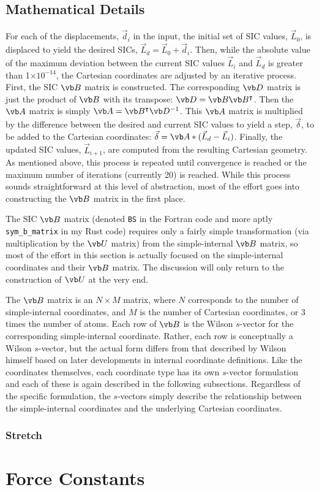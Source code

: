 \documentclass{article}
\newcommand\e[1]{$\times 10^{#1}$}
\begin{document}
\subsection{Mathematical Details}
\label{sec:disp-math}

For each of the displacements, $\vec{d}_i$ in the input, the initial set of SIC
values, $\vec{L}_0$, is displaced to yield the desired SICs,
$\vec{L}_d = \vec{L}_0 + \vec{d}_i$. Then, while the absolute value of the
maximum deviation between the current SIC values $\vec{L}_i$ and $\vec{L}_d$ is
greater than 1\e{-14}, the Cartesian coordinates are adjusted by an iterative
process. First, the SIC $\vb B$ matrix is constructed. The corresponding $\vb D$
matrix is just the product of $\vb B$ with its transpose:
$\vb D = \vb B \vb B^\intercal$. Then the $\vb A$ matrix is simply
$\vb A = \vb B^\intercal \vb D^{-1}$. This $\vb A$ matrix is multiplied by the
difference between the desired and current SIC values to yield a step,
$\vec{\delta}$, to be added to the Cartesian coordinates:
$\vec{\delta} = \vb A * (\vec{L}_d - \vec{L}_i)$. Finally, the updated SIC
values, $\vec{L}_{i+1}$, are computed from the resulting Cartesian geometry. As
mentioned above, this process is repeated until convergence is reached or the
maximum number of iterations (currently 20) is reached. While this process
sounds straightforward at this level of abstraction, most of the effort goes
into constructing the $\vb B$ matrix in the first place.

The SIC $\vb B$ matrix (denoted \verb|BS| in the Fortran code and more aptly
\verb|sym_b_matrix| in my Rust code) requires only a fairly simple
transformation (via multiplication by the $\vb U$ matrix) from the
simple-internal $\vb B$ matrix, so most of the effort in this section is
actually focused on the simple-internal coordinates and their $\vb B$ matrix.
The discussion will only return to the construction of $\vb U$ at the very end.

The $\vb B$ matrix is an $N \times M$ matrix, where $N$ corresponds to the
number of simple-internal coordinates, and $M$ is the number of Cartesian
coordinates, or 3 times the number of atoms. Each row of $\vb B$ is the Wilson
$s$-vector for the corresponding simple-internal coordinate. Rather, each row is
conceptually a Wilson $s$-vector, but the actual form differs from that
described by Wilson himself based on later developments in internal coordinate
definitions. Like the coordinates themselves, each coordinate type has its own
$s$-vector formulation and each of these is again described in the following
subsections. Regardless of the specific formulation, the $s$-vectors simply
describe the relationship between the simple-internal coordinates and the
underlying Cartesian coordinates.

\subsubsection{Stretch}
\label{sec:bmat-stre}

\section{Force Constants}
\label{sec:fcs}
\end{document}
